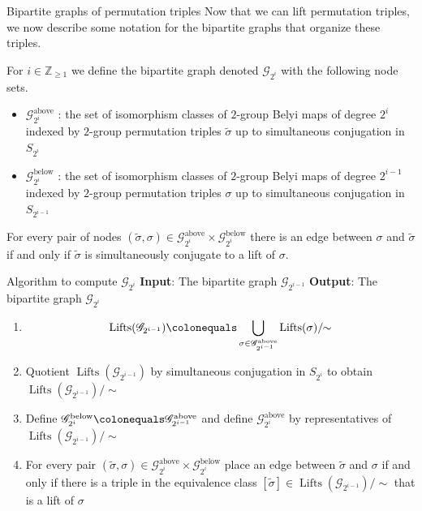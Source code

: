 \documentclass[xcolor=dvipsnames]{beamer}
\theoremstyle{plain}
\newcommand{\ZZ}{\mathbb Z}
\newcommand{\wt}[1]{\widetilde{#1}}
\DeclareMathOperator{\Lifts}{Lifts}
\begin{document}
  \begin{frame}{Bipartite graphs of permutation triples}
    Now that we can lift permutation triples,
    we now describe some notation for the bipartite
    graphs that organize these triples.
    \par
    For $i\in\ZZ_{\geq 1}$ we define the bipartite
    graph denoted $\mathscr{G}_{2^i}$ with the following
    node sets.
    \begin{itemize}
      \item
        $\mathscr{G}_{2^i}^\text{above}$ :
        the set of isomorphism classes of $2$-group Belyi maps
        of degree $2^i$
        indexed by $2$-group permutation triples
        $\wt{\sigma}$ up to simultaneous conjugation
        in $S_{2^i}$
      \item
        $\mathscr{G}_{2^i}^\text{below}$ :
        the set of isomorphism classes of $2$-group Belyi maps
        of degree $2^{i-1}$
        indexed by $2$-group permutation triples
        $\sigma$ up to simultaneous conjugation
        in $S_{2^{i-1}}$
    \end{itemize}
    For every pair of nodes
    $(\wt{\sigma},\sigma)\in
    \mathscr{G}_{2^i}^\text{above}\times
    \mathscr{G}_{2^i}^\text{below}$
    there is an edge between
    $\sigma$ and $\wt{\sigma}$
    if and only if $\wt{\sigma}$ is
    simultaneously conjugate to a lift of
    $\sigma$.
  \end{frame}
  \begin{frame}{Algorithm to compute $\mathscr{G}_{2^i}$}
    \textbf{Input}:
    The bipartite graph $\mathscr{G}_{2^{i-1}}$
    \newline
    \textbf{Output}:
    The bipartite graph $\mathscr{G}_{2^{i}}$
    \par
    \begin{enumerate}
      \item
        \[
          \Lifts(\mathscr{G}_{2^{i-1}})
          \colonequals
          \bigcup_{\sigma\in\mathscr{G}_{2^{i-1}}^\text{above}}\Lifts(\sigma)/\!\!\sim
        \]
      \item
        Quotient
        $\Lifts(\mathscr{G}_{2^{i-1}})$
        by simultaneous conjugation in $S_{2^i}$
        to obtain
        $\Lifts(\mathscr{G}_{2^{i-1}})/\!\!\sim$
      \item
        Define $\mathscr{G}_{2^i}^\text{below}\colonequals
        \mathscr{G}_{2^{i-1}}^\text{above}$
        and define
        $\mathscr{G}_{2^i}^\text{above}$
        by representatives of
        $\Lifts(\mathscr{G}_{2^{i-1}})/\!\!\sim$
      \item
        For every pair
        $(\wt{\sigma},\sigma)\in
        \mathscr{G}_{2^i}^\text{above}
        \times
        \mathscr{G}_{2^i}^\text{below}$
        place an edge between
        $\wt{\sigma}$ and $\sigma$
        if and only if there is a triple in
        the equivalence class
        $[\wt{\sigma}]\in
        \Lifts(\mathscr{G}_{2^{i-1}})/\!\!\sim$
        that is a lift of $\sigma$
    \end{enumerate}
  \end{frame}
\end{document}
